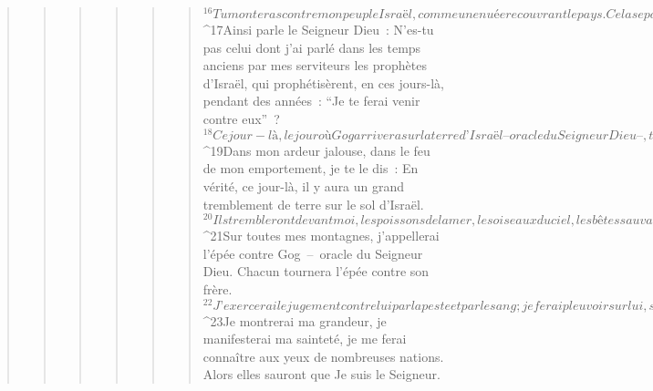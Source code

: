 \begin{verse}
\begin{verse}
\begin{verse}
\begin{verse}
\begin{verse}
\begin{verse}
${}^{16}Tu monteras contre mon peuple Israël, comme une nuée recouvrant le pays. Cela se passera à la fin des jours. Je te ferai venir contre mon pays, afin que les nations me connaissent quand, sous leurs yeux, j’aurai manifesté ma sainteté à tes dépens, ô Gog.
${}^{17}Ainsi parle le Seigneur Dieu : N’es-tu pas celui dont j’ai parlé dans les temps anciens par mes serviteurs les prophètes d’Israël, qui prophétisèrent, en ces jours-là, pendant des années : “Je te ferai venir contre eux” ? 
${}^{18}Ce jour-là, le jour où Gog arrivera sur la terre d’Israël – oracle du Seigneur Dieu –, tu me feras monter la fureur au visage. 
${}^{19}Dans mon ardeur jalouse, dans le feu de mon emportement, je te le dis : En vérité, ce jour-là, il y aura un grand tremblement de terre sur le sol d’Israël. 
${}^{20}Ils trembleront devant moi, les poissons de la mer, les oiseaux du ciel, les bêtes sauvages, tout ce qui rampe sur le sol et tous les êtres humains à la surface du sol ; les montagnes s’écrouleront, les escarpements s’effondreront, tous les remparts s’effondreront jusqu’à terre. 
${}^{21}Sur toutes mes montagnes, j’appellerai l’épée contre Gog – oracle du Seigneur Dieu. Chacun tournera l’épée contre son frère. 
${}^{22}J’exercerai le jugement contre lui par la peste et par le sang ; je ferai pleuvoir sur lui, sur ses bataillons, sur les nombreux peuples qui seront avec lui, une pluie torrentielle, des grêlons, du feu et du soufre. 
${}^{23}Je montrerai ma grandeur, je manifesterai ma sainteté, je me ferai connaître aux yeux de nombreuses nations. Alors elles sauront que Je suis le Seigneur.
      

\end{verse}
\end{verse}
\end{verse}
\end{verse}
\end{verse}
\end{verse}
